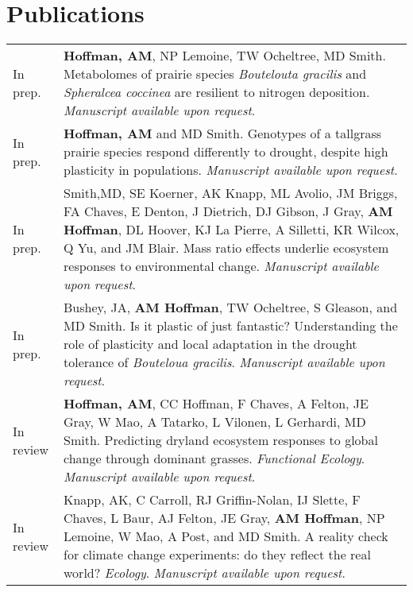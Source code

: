\documentclass[letterpaper]{deedy-resume} %
\begin{document}

\section{Publications}
\begin{tabular}{>{\raggedleft\arraybackslash}p{2cm}p{16cm}}

In prep. & \textbf{Hoffman, AM}, NP Lemoine, TW Ocheltree, MD Smith. Metabolomes of prairie species \textit{Boutelouta gracilis} and \textit{Spheralcea coccinea} are resilient to nitrogen deposition. \textit{Manuscript available upon request}.\\

In prep. & \textbf{Hoffman, AM} and MD Smith. Genotypes of a tallgrass prairie species respond differently to drought, despite high plasticity in populations. \textit{Manuscript available upon request}.\\

In prep. & Smith,MD, SE Koerner, AK Knapp, ML Avolio, JM Briggs, FA Chaves, E Denton, J Dietrich, DJ Gibson, J Gray, \textbf{AM Hoffman}, DL Hoover, KJ La Pierre, A Silletti, KR Wilcox, Q Yu, and JM Blair. Mass ratio effects underlie ecosystem responses to environmental change. \textit{Manuscript available upon request}.\\

In prep. & Bushey, JA, \textbf{AM Hoffman}, TW Ocheltree, S Gleason, and MD Smith. Is it plastic of just fantastic? Understanding the role of plasticity and local adaptation in the drought tolerance of \textit{Bouteloua gracilis}. \textit{Manuscript available upon request}.\\

In review & \textbf{Hoffman, AM}, CC Hoffman, F Chaves, A Felton, JE Gray, W Mao, A Tatarko, L Vilonen, L Gerhardi, MD Smith. Predicting dryland ecosystem responses to global change through dominant grasses. \textcolor{special}{\textit{Functional Ecology}}. \textit{Manuscript available upon request}.\\

In review & Knapp, AK, C Carroll, RJ Griffin-Nolan, IJ Slette, F Chaves, L Baur, AJ Felton, JE Gray, \textbf{AM Hoffman}, NP Lemoine, W Mao, A Post, and MD Smith. A reality check for climate change experiments: do they reflect the real world? \textcolor{special}{\textit{Ecology}}. \textit{Manuscript available upon request}.\\

\end{tabular}
\end{document}
